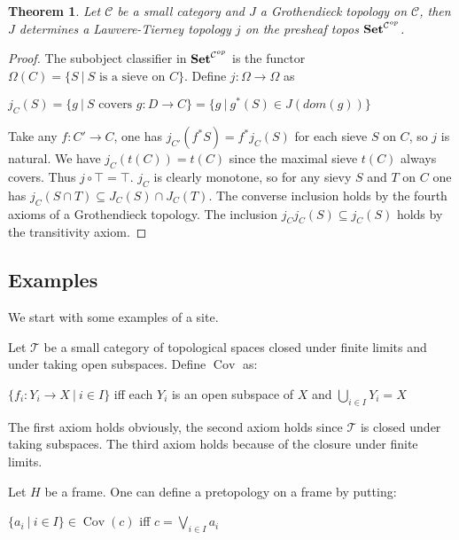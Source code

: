 \documentclass[a4paper]{article}
\theoremstyle{defin}
\theoremstyle{theorem}
\newtheorem{theorem}{Theorem}
\theoremstyle{claim}
\theoremstyle{prop}
\theoremstyle{lemma}
\theoremstyle{fact}
\theoremstyle{ex}
\theoremstyle{col}
\begin{document}
\begin{theorem}
Let $\mathcal{C}$ be a small category and $J$ a Grothendieck topology on $\mathcal{C}$, then $J$ determines a Lawvere-Tierney topology $j$ on the presheaf topos ${\bf Set}^{\mathcal{C}^{op}}$.
\end{theorem}

\begin{proof}
The subobject classifier in ${\bf Set}^{\mathcal{C}^{op}}$ is the functor $\Omega(C) = \{ S \: | \: \text{$S$ is a sieve on $C$}\}$. Define $j : \Omega \to \Omega$ as
\begin{center}
$j_C(S) = \{ g \: | \: \text{$S$ covers $g : D \to C$}\} = \{ g \: | \: g^*(S) \in J(dom(g))\}$
\end{center}
Take any $f : C' \to C$, one has $j_{C'}(f^{*}S) = f^{*}j_C(S)$ for each sieve $S$ on $C$, so $j$ is natural. We have $j_C(t(C)) = t(C)$ since the maximal sieve $t(C)$ always covers. Thus $j \circ \top = \top$.
$j_C$ is clearly monotone, so for any sievy $S$ and $T$ on $C$ one has $j_C(S \cap T) \subseteq J_C(S) \cap J_C(T)$. The converse inclusion holds by the fourth axioms of a Grothendieck topology. The inclusion $j_C j_C(S) \subseteq j_C(S)$ holds by the transitivity axiom.
\end{proof}

\subsection{Examples}

We start with some examples of a site.

Let $\mathcal{T}$ be a small category of topological spaces closed under finite limits and under taking open subspaces. Define $\operatorname{Cov}$ as:
\begin{center}
$\{ f_i : Y_i \to X \: | \: i \in I \}$ iff each $Y_i$ is an open subspace of $X$ and $\bigcup \limits_{i \in I} Y_i = X$
\end{center}

The first axiom holds obviously, the second axiom holds since $\mathcal{T}$ is closed under taking subspaces. The third axiom holds because of the closure under finite limits.

Let $H$ be a frame. One can define a pretopology on a frame by putting:
\begin{center}
$\{ a_i \: | \: i \in I \} \in \operatorname{Cov}(c)$ iff $c = \bigvee \limits_{i \in I} a_i$
\end{center}
\end{document}
